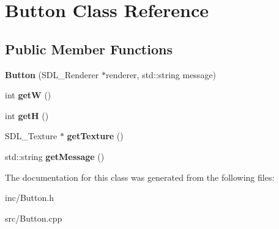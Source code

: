 \hypertarget{class_button}{}\section{Button Class Reference}
\label{class_button}
\subsection*{Public Member Functions}
\begin{DoxyCompactItemize}
\item 
\mbox{\label{class_button_a88fecce84e7e2dbef041b8eebefdfdb0}} 
{\bfseries Button} (S\+D\+L\+\_\+\+Renderer $\ast$renderer, std\+::string message)
\item 
\mbox{\label{class_button_a4414f9dfe2de8a6ab7859421285a7741}} 
int {\bfseries getW} ()
\item 
\mbox{\label{class_button_a50bd522f5b9ff03b371e7991977ed40e}} 
int {\bfseries getH} ()
\item 
\mbox{\label{class_button_a5c54af66e75f6ad17171710361b78b21}} 
S\+D\+L\+\_\+\+Texture $\ast$ {\bfseries get\+Texture} ()
\item 
\mbox{\label{class_button_a0bba34486ba674a80af740a2b157996a}} 
std\+::string {\bfseries get\+Message} ()
\end{DoxyCompactItemize}


The documentation for this class was generated from the following files\+:\begin{DoxyCompactItemize}
\item 
inc/Button.\+h\item 
src/Button.\+cpp\end{DoxyCompactItemize}
